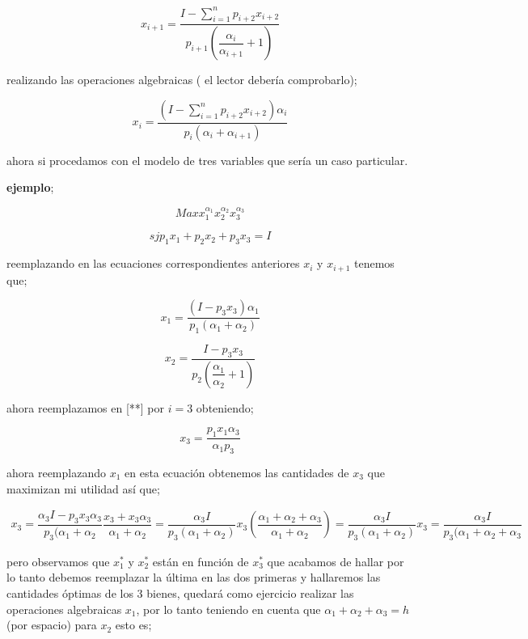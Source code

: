 \documentclass[12pt]{article}
\begin{document}
$$x_{i+1}=\dfrac{I - \sum_{i=1}^{n}p_{i+2}x_{i+2}}{p_{i+1}  \left(  \dfrac{\alpha_{i}}{\alpha_{i+1}} +1 \right) }$$

realizando las operaciones algebraicas ( el lector debería comprobarlo); 

$$x_{i}= \dfrac{(I- \sum_{i=1}^{n}p_{i+2}x_{i+2}) \alpha_{i}}{p_{i}(\alpha_{i}+ \alpha_{i+1})}$$

ahora si procedamos con el modelo de tres variables que sería un caso particular. 

\textbf{ejemplo};


$$ Max  x_{1}^{\alpha_{1}} x_{2}^{\alpha_{2}} x_{3}^{\alpha_{3}}$$

$$sj p_{1}x_{1}+p_{2}x_{2}+p_{3}x_{3}=I$$

reemplazando en las ecuaciones correspondientes anteriores $x_{i}$ y $x_{i+1}$ tenemos que;



$$x_{1}= \dfrac{(I-p_{3}x_{3})\alpha_{1}}{p_{1}(\alpha_{1} + \alpha_{2})}$$

$$x_{2}= \dfrac{I - p_{3} x_{3}}{p_{2}  (\dfrac{ \alpha_{1}}{\alpha_{2}} +1) } $$

ahora reemplazamos  en [**] por $i=3$ obteniendo;

$$x_{3}= \dfrac{p_{1}x_{1}\alpha_{3}}{\alpha_{1} p_{3}}$$

ahora reemplazando $x_{1}$ en esta ecuación obtenemos las cantidades de $x_{3}$ que maximizan mi utilidad así que; 

\begin{eqnarray}

x_{3}= \dfrac{\alpha_{3}I - p_{3}x_{3} \alpha_{3}}{p_{3} (\alpha_{1} + \alpha_{2}}

\dfrac{ x_{3}+x_{3}\alpha_{3}}{\alpha_{1} + \alpha _{2}} = \dfrac{\alpha_{3}I}{p_{3}(\alpha_{1}+\alpha_{2})}

x_{3} (\dfrac{\alpha_{1}+\alpha_{2}+\alpha_{3}}{\alpha_{1}+\alpha_{2}}) = \dfrac{\alpha_{3}I}{p_{3}(\alpha_{1}+\alpha_{2})}


x_{3}= \dfrac{\alpha_{3}I}{p_{3}(\alpha_{1}+ \alpha_{2}+\alpha_{3}}



\end{eqnarray}

pero observamos que $x_{1}^{*}$ y $x_{2}^{*}$ están en función de $x_{3}^{*} $ que acabamos de hallar por lo tanto debemos reemplazar la última en las  dos primeras y hallaremos las cantidades óptimas de los 3 bienes, quedará como ejercicio realizar las operaciones algebraicas  $x_{1}$, por lo tanto teniendo en cuenta que $\alpha_{1}+\alpha_{2}+\alpha_{3}=h$ (por espacio) para $x_{2}$ esto es;
\end{document}
